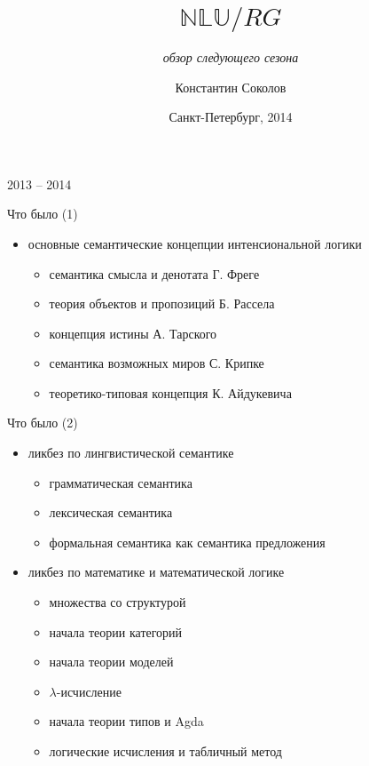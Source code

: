 \documentclass{beamer}
\begin{document}
\title{\Large{$\mathbb{NLU}/RG$}}
\subtitle{\textit{обзор следующего сезона}}
\author{Константин Соколов}
\date{Санкт-Петербург, 2014} 
\begin{frame}
    \thispagestyle{empty}
    \titlepage
\end{frame}

\begin{frame}{}
\begin{center}
2013 -- 2014
\end{center}
\end{frame}

\begin{frame}{Что было (1)}
\begin{small}
\begin{itemize}
    \item основные семантические концепции интенсиональной логики
    \begin{itemize}
        \item семантика смысла и денотата Г. Фреге
        \item теория объектов и пропозиций Б. Рассела
        \item концепция истины А. Тарского
        \item семантика возможных миров С. Крипке
        \item теоретико-типовая концепция К. Айдукевича    
    \end{itemize}
\end{itemize}
\end{small}
\end{frame}

\begin{frame}{Что было (2)}
\begin{small}
\begin{itemize}
    \item ликбез по лингвистической семантике
    \begin{itemize}
        \item грамматическая семантика
        \item лексическая семантика
        \item формальная семантика как семантика предложения
    \end{itemize}
    \item ликбез по математике и математической логике
    \begin{itemize}
        \item множества со структурой
        \item начала теории категорий
        \item начала теории моделей
        \item $\lambda$-исчисление
        \item начала теории типов и Agda
        \item логические исчисления и табличный метод
    \end{itemize}
\end{itemize}
\end{small}
\end{frame}
\end{document}
